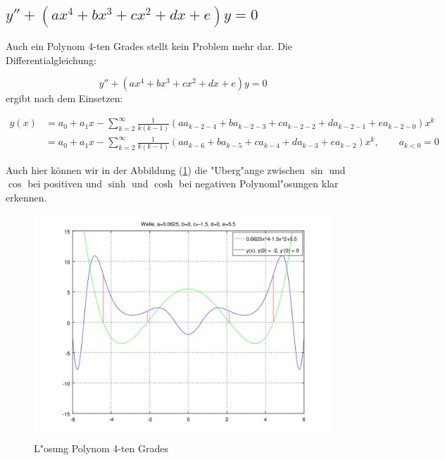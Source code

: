 \subsection{\texorpdfstring{$y''+(ax^4+bx^3+cx^2+dx+e)y = 
0$}{y''-(ax4+bx3+cx2+dx+e)y = 0}}

Auch ein Polynom 4-ten Grades stellt kein Problem mehr dar. Die 
Differentialgleichung:

\begin{equation*}
	y''+(ax^4+bx^3+cx^2+dx+e)y = 0
\end{equation*}
ergibt nach dem Einsetzen:

\begin{align*}
	y(x) &= a_0+a_1x-\sum_{k=2}^{\infty} \frac{1}{k(k-1)} (aa_{k-2-4} + 
	ba_{k-2-3} + ca_{k-2-2} + da_{k-2-1} +ea_{k-2-0})x^k
	\\
	&= a_0+a_1x-\sum_{k=2}^{\infty} \frac{1}{k(k-1)} (aa_{k-6} + ba_{k-5} + 
	ca_{k-4} + da_{k-3} +ea_{k-2})x^k, \qquad a_{k<0} = 0
\end{align*}

Auch hier können wir in der Abbildung (\ref{fig:wellen:poly4-dgl}) die 
"Uberg"ange zwischen $\sin$ und $\cos$ bei positiven und $\sinh$ und $\cosh$ 
bei negativen Polynoml"osungen klar erkennen.

\begin{figure}
	\includegraphics[scale=0.65]{./wellen/images/allgemein/n4.png}
	\caption{L"osung Polynom 4-ten Grades}
	\label{fig:wellen:poly4-dgl}
\end{figure}